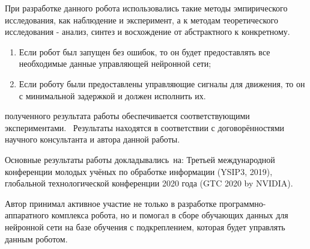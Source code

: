 {\methods} При разработке данного робота использовались такие методы эмпирического исследования, как наблюдение и эксперимент, а к методам теоретического исследования - анализ, синтез и восхождение от абстрактного к конкретному.

{}
\begin{enumerate}[beginpenalty=10000] %
  \item Если робот был запущен без ошибок, то он будет предоставлять все необходимые данные управляющей нейронной сети;
  \item Если роботу были предоставлены управляющие сигналы для движения, то он с минимальной задержкой и должен исполнить их.
\end{enumerate}

{\reliability} полученного результата работы обеспечивается соответствующими экспериментами. \ Результаты находятся в соответствии с договорённостями научного консультанта и автора данной работы.


{\probation}
Основные результаты работы докладывались~на:
Третьей международной конференции молодых учёных по обработке информации (YSIP3, 2019), глобальной технологической конференции 2020 года (GTC 2020 by NVIDIA).

{\contribution} Автор принимал активное участие не только в разработке программно-аппаратного комплекса робота, но и помогал в сборе обучающих данных для нейронной сети на базе обучения с подкреплением, которая будет управлять данным роботом.

